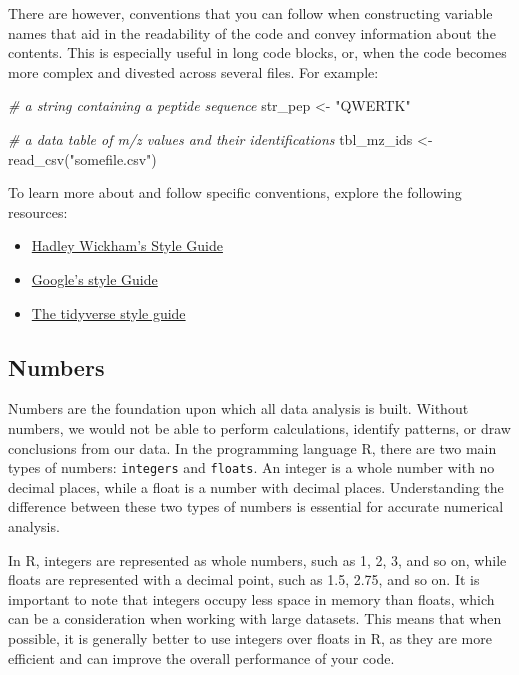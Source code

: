 \documentclass[
]{book}
\newenvironment{Shaded}{\begin{snugshade}}{\end{snugshade}}
\newcommand{\CommentTok}[1]{\textcolor[rgb]{0.56,0.35,0.01}{\textit{#1}}}
\newcommand{\FunctionTok}[1]{\textcolor[rgb]{0.00,0.00,0.00}{#1}}
\newcommand{\NormalTok}[1]{#1}
\newcommand{\OtherTok}[1]{\textcolor[rgb]{0.56,0.35,0.01}{#1}}
\newcommand{\StringTok}[1]{\textcolor[rgb]{0.31,0.60,0.02}{#1}}
\begin{document}
There are however, conventions that you can follow when constructing variable names that aid in the readability of the code and convey information about the contents. This is especially useful in long code blocks, or, when the code becomes more complex and divested across several files. For example:

\begin{Shaded}
\begin{Highlighting}[]
\CommentTok{\# a string containing a peptide sequence}
\NormalTok{str\_pep }\OtherTok{\textless{}{-}} \StringTok{"QWERTK"}

\CommentTok{\# a data table of m/z values and their identifications}
\NormalTok{tbl\_mz\_ids }\OtherTok{\textless{}{-}} \FunctionTok{read\_csv}\NormalTok{(}\StringTok{"somefile.csv"}\NormalTok{)}
\end{Highlighting}
\end{Shaded}

To learn more about and follow specific conventions, explore the following resources:

\begin{itemize}
\item
  \href{http://adv-r.had.co.nz/Style.html}{Hadley Wickham's Style Guide}
\item
  \href{https://google.github.io/styleguide/Rguide.html}{Google's style Guide}
\item
  \href{https://style.tidyverse.org/}{The tidyverse style guide}
\end{itemize}

\hypertarget{numbers}{%
\subsection{Numbers}\label{numbers}}

Numbers are the foundation upon which all data analysis is built. Without numbers, we would not be able to perform calculations, identify patterns, or draw conclusions from our data. In the programming language R, there are two main types of numbers: \texttt{integers} and \texttt{floats}. An integer is a whole number with no decimal places, while a float is a number with decimal places. Understanding the difference between these two types of numbers is essential for accurate numerical analysis.

In R, integers are represented as whole numbers, such as 1, 2, 3, and so on, while floats are represented with a decimal point, such as 1.5, 2.75, and so on. It is important to note that integers occupy less space in memory than floats, which can be a consideration when working with large datasets. This means that when possible, it is generally better to use integers over floats in R, as they are more efficient and can improve the overall performance of your code.
\end{document}
